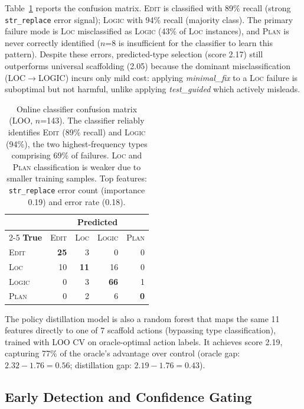 \documentclass[11pt]{article}
\begin{document}
Table~\ref{tab:confusion} reports the confusion matrix.
\textsc{Edit} is classified with 89\% recall (strong \texttt{str\_replace} error signal); \textsc{Logic} with 94\% recall (majority class).
The primary failure mode is \textsc{Loc} misclassified as \textsc{Logic} (43\% of \textsc{Loc} instances), and \textsc{Plan} is never correctly identified ($n$=8 is insufficient for the classifier to learn this pattern).
Despite these errors, predicted-type selection (score 2.17) still outperforms universal scaffolding (2.05) because the dominant misclassification (LOC$\to$LOGIC) incurs only mild cost: applying \textit{minimal\_fix} to a \textsc{Loc} failure is suboptimal but not harmful, unlike applying \textit{test\_guided} which actively misleads.

\begin{table}[t]
\centering
\small
\begin{tabular}{@{}lrrrr@{}}
\toprule
& \multicolumn{4}{c}{\textbf{Predicted}} \\
\cmidrule(l){2-5}
\textbf{True} & \textsc{Edit} & \textsc{Loc} & \textsc{Logic} & \textsc{Plan} \\
\midrule
\textsc{Edit} & \textbf{25} & 3 & 0 & 0 \\
\textsc{Loc} & 10 & \textbf{11} & 16 & 0 \\
\textsc{Logic} & 0 & 3 & \textbf{66} & 1 \\
\textsc{Plan} & 0 & 2 & 6 & \textbf{0} \\
\bottomrule
\end{tabular}
\caption{Online classifier confusion matrix (LOO, $n$=143). The classifier reliably identifies \textsc{Edit} (89\% recall) and \textsc{Logic} (94\%), the two highest-frequency types comprising 69\% of failures. \textsc{Loc} and \textsc{Plan} classification is weaker due to smaller training samples. Top features: \texttt{str\_replace} error count (importance 0.19) and error rate (0.18).}
\label{tab:confusion}
\end{table}

The policy distillation model is also a random forest that maps the same 11 features directly to one of 7 scaffold actions (bypassing type classification), trained with LOO CV on oracle-optimal action labels.
It achieves score 2.19, capturing 77\% of the oracle's advantage over control (oracle gap: $2.32 - 1.76 = 0.56$; distillation gap: $2.19 - 1.76 = 0.43$).

\subsection{Early Detection and Confidence Gating}
\end{document}
